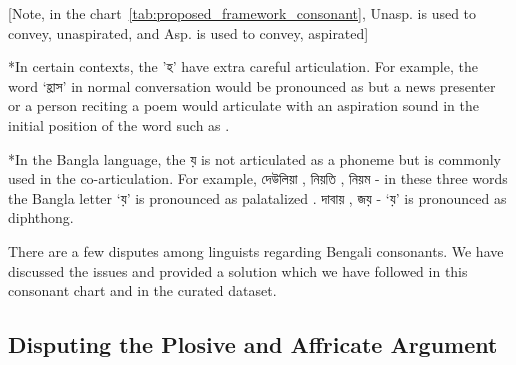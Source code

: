 [Note, in the chart~\ref{tab:proposed_framework_consonant}, Unasp. is used to convey, unaspirated, and Asp. is used to convey, aspirated]

\vspace{5mm}

*In certain contexts, the \textbengali{'হ'}  have extra careful articulation. For example, the word \textbengali{‘হ্রাস’}	in normal conversation would be pronounced as  but a news presenter or a person reciting a poem would articulate with an aspiration sound in the initial position of the word such as .

\vspace{5mm}

*In the Bangla language, the \textbengali{য়}  is not articulated as a phoneme but is commonly used in the co-articulation. For example,  \textbengali{দেউলিয়া} , \textbengali{নিয়তি} , \textbengali{নিয়ম} - in these three words the Bangla letter \textbengali{‘য়’} is pronounced as palatalized . \textbengali{দাবায়} , \textbengali{জয়}  - \textbengali{‘য়’} is pronounced as diphthong.

\vspace{5mm}

There are a few disputes among linguists regarding Bengali consonants. We have discussed the issues and provided a solution which we have followed in this consonant chart and in the curated dataset.

\subsection{Disputing the Plosive and Affricate Argument}

\begin{table}[!ht]
    \centering
    \caption{Phonetic Transcription for Plosive and Affricate}
\end{table}

